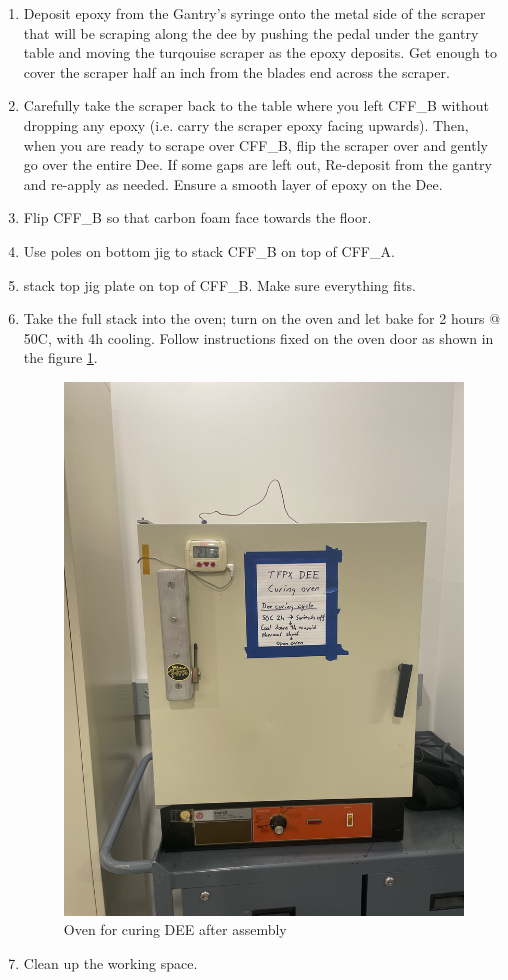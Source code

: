 \documentclass[12pt]{cornelltfpxsop}
\begin{document}
\begin{paracol}{2}
\begin{enumerate}
        \item Deposit epoxy from the Gantry's syringe onto the metal side of the scraper that will be scraping along the dee by pushing the pedal under the gantry table and moving the turqouise scraper as the epoxy deposits. Get enough to cover the scraper half an inch from the blades end across the scraper.
        \item Carefully take the scraper back to the table where you left CFF\_B without dropping any epoxy (i.e. carry the scraper epoxy facing upwards). Then, when you are ready to scrape over CFF\_B, flip the scraper over and gently go over the entire Dee. If some gaps are left out, Re-deposit from the gantry and re-apply as needed. Ensure a smooth layer of epoxy on the Dee.
        \item Flip CFF\_B so that carbon foam face towards the floor.
        \item Use poles on bottom jig to stack CFF\_B on top of CFF\_A.
        \item stack top jig plate on top of CFF\_B. Make sure everything fits.
        \item Take the full stack into the oven; turn on the oven and let bake for 2 hours @ 50C, with 4h cooling. Follow instructions fixed on the oven door as shown in the figure \ref{oven}. 
        \begin{figure}
            \centering
            \includegraphics[width=0.9\linewidth, angle=-90]{img/oven.JPG}
            \caption{Oven for curing DEE after assembly}
            \label{oven}
        \end{figure}
        \item Clean up the working space.
\end{enumerate}
\switchcolumn %

\end{paracol}
\end{document}
